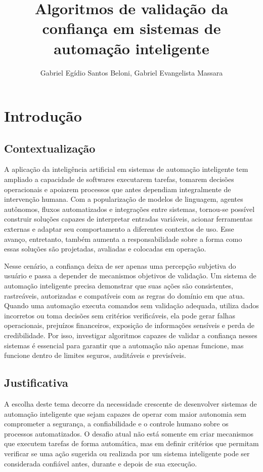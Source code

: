 \documentclass[12pt]{article}
\title{Algoritmos de validação da confiança em sistemas de automação inteligente}
\author{Gabriel Egídio Santos Beloni\inst{1}, Gabriel Evangelista Massara\inst{2}}
\begin{document}
 

\maketitle

\section{Introdução}
\subsection{Contextualização}

A aplicação da inteligência artificial em sistemas de automação inteligente tem ampliado a capacidade de softwares executarem tarefas, tomarem decisões operacionais e apoiarem processos que antes dependiam integralmente de intervenção humana. Com a popularização de modelos de linguagem, agentes autônomos, fluxos automatizados e integrações entre sistemas, tornou-se possível construir soluções capazes de interpretar entradas variáveis, acionar ferramentas externas e adaptar seu comportamento a diferentes contextos de uso. Esse avanço, entretanto, também aumenta a responsabilidade sobre a forma como essas soluções são projetadas, avaliadas e colocadas em operação.

Nesse cenário, a confiança deixa de ser apenas uma percepção subjetiva do usuário e passa a depender de mecanismos objetivos de validação. Um sistema de automação inteligente precisa demonstrar que suas ações são consistentes, rastreáveis, autorizadas e compatíveis com as regras do domínio em que atua. Quando uma automação executa comandos sem validação adequada, utiliza dados incorretos ou toma decisões sem critérios verificáveis, ela pode gerar falhas operacionais, prejuízos financeiros, exposição de informações sensíveis e perda de credibilidade. Por isso, investigar algoritmos capazes de validar a confiança nesses sistemas é essencial para garantir que a automação não apenas funcione, mas funcione dentro de limites seguros, auditáveis e previsíveis.

\subsection{Justificativa}

A escolha deste tema decorre da necessidade crescente de desenvolver sistemas de automação inteligente que sejam capazes de operar com maior autonomia sem comprometer a segurança, a confiabilidade e o controle humano sobre os processos automatizados. O desafio atual não está somente em criar mecanismos que executem tarefas de forma automática, mas em definir critérios que permitam verificar se uma ação sugerida ou realizada por um sistema inteligente pode ser considerada confiável antes, durante e depois de sua execução.
\end{document}
